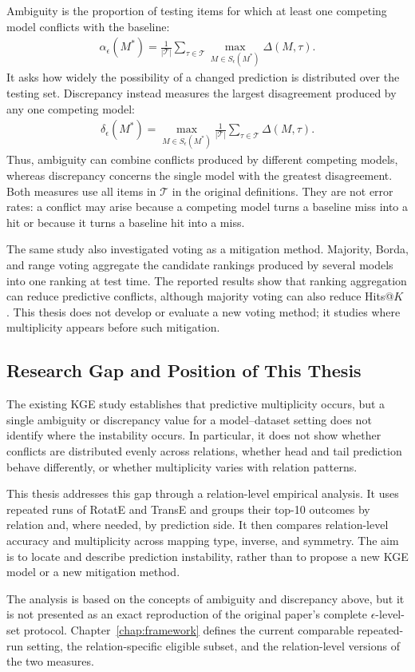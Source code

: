 Ambiguity is the proportion of testing items for which at least one competing
model conflicts with the baseline:
\begin{align}
    \alpha_\epsilon(M^*)
    =
    \frac{1}{|\mathcal{T}|}
    \sum_{\tau\in\mathcal{T}}
    \max_{M\in S_\epsilon(M^*)}
    \Delta(M,\tau).
\end{align}
It asks how widely the possibility of a changed prediction is distributed
over the testing set. Discrepancy instead measures the largest disagreement
produced by any one competing model:
\begin{align}
    \delta_\epsilon(M^*)
    =
    \max_{M\in S_\epsilon(M^*)}
    \frac{1}{|\mathcal{T}|}
    \sum_{\tau\in\mathcal{T}}
    \Delta(M,\tau).
\end{align}
Thus, ambiguity can combine conflicts produced by different competing models,
whereas discrepancy concerns the single model with the greatest disagreement.
Both measures use all items in $\mathcal{T}$ in the original definitions.
They are not error rates: a conflict may arise because a competing model turns
a baseline miss into a hit or because it turns a baseline hit into a miss.

The same study also investigated voting as a mitigation method. Majority,
Borda, and range voting aggregate the candidate rankings produced by several
models into one ranking at test time. The reported results show that ranking
aggregation can reduce predictive conflicts, although majority voting can also
reduce Hits@$K$ \citep{zhu2024predictive}. This thesis does not develop or
evaluate a new voting method; it studies where multiplicity appears before
such mitigation.

\subsection{Research Gap and Position of This Thesis}

The existing KGE study establishes that predictive multiplicity occurs, but a
single ambiguity or discrepancy value for a model--dataset setting does not
identify where the instability occurs. In particular, it does not show whether
conflicts are distributed evenly across relations, whether head and tail
prediction behave differently, or whether multiplicity varies with relation
patterns.

This thesis addresses this gap through a relation-level empirical analysis. It
uses repeated runs of RotatE and TransE and groups their top-10 outcomes by
relation and, where needed, by prediction side. It then compares relation-level
accuracy and multiplicity across mapping type, inverse, and symmetry. The aim
is to locate and describe prediction instability, rather than to propose a new
KGE model or a new mitigation method.

The analysis is based on the concepts of ambiguity and discrepancy above, but
it is not presented as an exact reproduction of the original paper's complete
$\epsilon$-level-set protocol. Chapter~\ref{chap:framework} defines the current
comparable repeated-run setting, the relation-specific eligible subset, and the
relation-level versions of the two measures.
